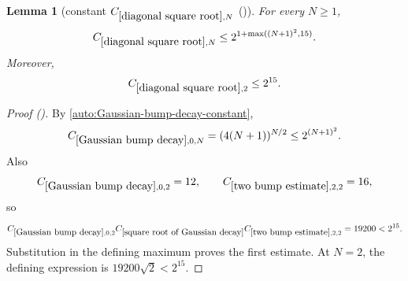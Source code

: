 \documentclass[12pt,reqno]{amsart}
\newcommand{\auto}{{({\tiny\faCar})}}
\theoremstyle{plain}
\newtheorem{lemma}[theorem]{Lemma}
\numberwithin{equation}{section}
\theoremstyle{remark}
\newcommand{\using}[1]{}
\begin{document}
\begin{lemma}[constant $C_{\ref{diagonal square root},N}$ \auto]\label{constant diagonal square root}\using{Gaussian bump decay}\using{two bump estimate}\using{square root of Gaussian decay}
For every $N\ge1$,
\begin{equation}\label{constant diagonal square root bound}
C_{\ref{diagonal square root},N}
\le2^{1+\max((N+1)^2,15)}.
\end{equation}
Moreover,
\begin{equation}\label{auto:constant-diagonal-square-root-two}
C_{\ref{diagonal square root},2}\le2^{15}.
\end{equation}
\end{lemma}
\begin{proof}[Proof \auto]
By \eqref{auto:Gaussian-bump-decay-constant},
\[
C_{\ref{Gaussian bump decay},0,N}
=(4(N+1))^{N/2}
\le2^{(N+1)^2}.
\]
Also
\[
C_{\ref{Gaussian bump decay},0,2}=12,
\qquad
C_{\ref{two bump estimate},2,2}=16,
\]
so
\[
C_{\ref{Gaussian bump decay},0,2}
C_{\ref{square root of Gaussian decay}}
C_{\ref{two bump estimate},2,2}
=19200<2^{15}.
\]
Substitution in the defining maximum proves the first estimate. At $N=2$, the defining expression is $19200\sqrt2<2^{15}$.
\end{proof}
\end{document}
